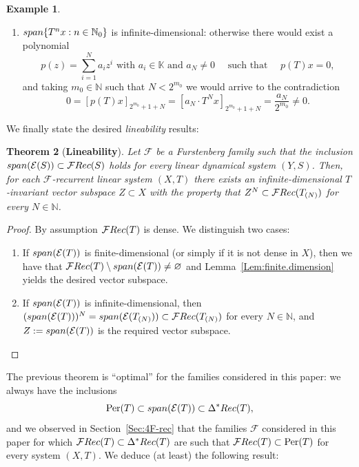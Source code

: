 \documentclass[openright,11pt]{article}
\theoremstyle{plain}
\newtheorem{theorem}{Theorem}[section]
\theoremstyle{definition}
\newtheorem{example}[theorem]{Example}
\newcommand{\NN}{\mathbb{N}}
\newcommand{\KK}{\mathbb{K}}
\newcommand{\Del}{\Delta}
\newcommand{\Ec}{\mathcal{E}}
\newcommand{\Fc}{\mathcal{F}}
\newcommand{\Per}{\operatorname{Per}}
\newcommand{\Rec}{\textup{Rec}}
\newcommand{\lspan}{\textup{span}}
\begin{document}
\begin{example}
\begin{enumerate}[1)]
		\item $\lspan\{T^nx : n\in\NN_0\}$ is infinite-dimensional: otherwise there would exist a polynomial
		\[
		p(z) = \sum_{i=1}^N a_i z^i \text{ with } a_i \in \KK \text{ and } a_N\neq 0 \quad \text{ such that } \quad p(T)x=0,
		\]
		and taking $m_0 \in \NN$ such that $N<2^{m_0}$ we would arrive to the contradiction
		\[
		0 = \left[p(T)x\right]_{2^{m_0}+1+N} = \left[ a_N \cdot T^Nx \right]_{2^{m_0}+1+N} = \frac{a_N}{2^{m_0}} \neq 0.
		\]
	\end{enumerate}
\end{example}

We finally state the desired {\em lineability} results:

\begin{theorem}[\textbf{Lineability}]\label{The:lineability}
	Let $\Fc$ be a Furstenberg family such that the inclusion $\lspan(\Ec(S)) \subset \Fc\Rec(S)$ holds for every linear dynamical system $(Y,S)$. Then, for each $\Fc$-recurrent linear system $(X,T)$ there exists an infinite-dimensional $T$-invariant vector subspace $Z \subset X$ with the property that $Z^N \subset \Fc\Rec(T_{(N)})$ for every $N \in \NN$.
\end{theorem}
\begin{proof} 
	By assumption $\Fc\Rec(T)$ is dense. We distinguish two cases:
	\begin{enumerate}[(1)]
		\item If $\lspan(\Ec(T))$ is finite-dimensional (or simply if it is not dense in $X$), then we have that $\Fc\Rec(T)\setminus\lspan(\Ec(T))\neq\varnothing$ and Lemma~\ref{Lem:finite.dimension} yields the desired vector subspace.
		
		\item If $\lspan(\Ec(T))$ is infinite-dimensional, then $(\lspan(\Ec(T)))^N = \lspan(\Ec(T_{(N)})) \subset \Fc\Rec(T_{(N)})$ for every $N \in \NN$, and $Z:=\lspan(\Ec(T))$ is the required vector subspace.\qedhere
	\end{enumerate}
\end{proof}

The previous theorem is ``optimal'' for the families considered in this paper: we always have the inclusions
\[
\Per(T) \subset \lspan(\Ec(T)) \subset \Del^*\Rec(T),
\]
and we observed in Section~\ref{Sec:4F-rec} that the families $\Fc$ considered in this paper for which $\Fc\Rec(T) \subset \Del^*\Rec(T)$ are such that $\Fc\Rec(T) \subset \Per(T)$ for every system $(X,T)$. We deduce (at least) the following result:
\end{document}
